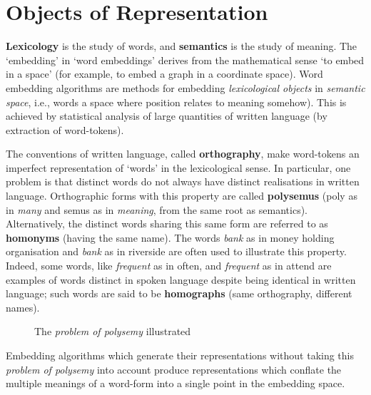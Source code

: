 \section{Objects of Representation}
\textbf{Lexicology} is the study of words, and \textbf{semantics} is the study of meaning. The `embedding' in `word embeddings' derives from the mathematical sense `to embed in a space' (for example, to embed a graph in a coordinate space). Word embedding algorithms are methods for embedding \emph{lexicological objects} in \emph{semantic space}, i.e., words a space where position relates to meaning somehow). This is achieved by statistical analysis of large quantities of written language (by extraction of word-tokens).

The conventions of written language, called \textbf{orthography}, make word-tokens an imperfect representation of `words' in the lexicological sense. In particular, one problem is that distinct words do not always have distinct realisations in written language. Orthographic forms with this property are called \textbf{polysemus} (poly as in \emph{many} and semus as in \emph{meaning}, from the same root as semantics). Alternatively, the distinct words sharing this same form are referred to as \textbf{homonyms} (having the same name). The words \emph{bank} as in money holding organisation and \emph{bank} as in riverside are often used to illustrate this property. Indeed, some words, like \emph{frequent} as in often, and \emph{frequent} as in attend are examples of words distinct in spoken language despite being identical in written language; such words are said to be \textbf{homographs} (same orthography, different names).

\begin{figure}[h]
 \centering
 
 \caption{The \emph{problem of polysemy} illustrated}
\end{figure}

Embedding algorithms which generate their representations without taking this \emph{problem of polysemy} into account produce representations which conflate the multiple meanings of a word-form into a single point in the embedding space.
